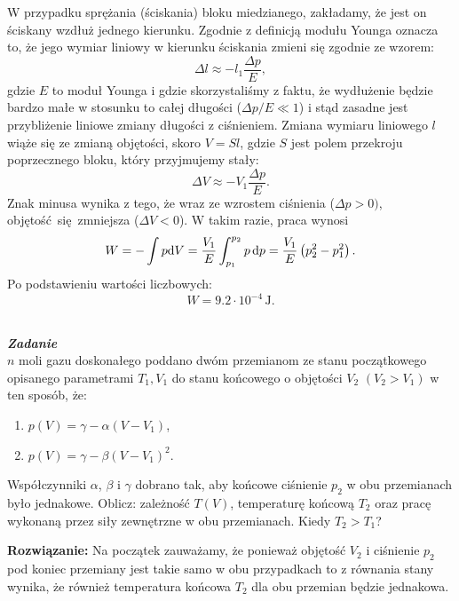 \documentclass[11pt,a4paper]{article}
\newcounter{zadanie}\newcommand{\zadanie}[1][]{\addtocounter{zadanie}{1} ~\\  {\bf \emph{Zadanie \arabic{zadanie} #1 }} \\}
\renewcommand{\t}[1]{\textrm{#1}}
\begin{document}
W przypadku sprężania (ściskania) bloku miedzianego, zakładamy, że jest on ściskany wzdłuż jednego kierunku. Zgodnie z definicją modułu Younga oznacza to,  że jego wymiar liniowy w kierunku ściskania zmieni się zgodnie ze wzorem:
$$
\Delta l \approx -l_1 \frac{\Delta p}{E},
$$
gdzie $E$ to moduł Younga i gdzie skorzystaliśmy z faktu, że wydłużenie będzie bardzo małe w stosunku
to całej długości ($\Delta p /E \ll 1$) i stąd zasadne jest przybliżenie liniowe zmiany długości z ciśnieniem.
Zmiana wymiaru liniowego $l$ wiąże się ze zmianą objętości, skoro $V = S l$,
 gdzie $S$ jest polem przekroju poprzecznego bloku, który przyjmujemy stały:
$$
\Delta V \approx   - V_1 \frac{\Delta p}{E}.
$$
Znak minusa wynika z tego, że wraz ze wzrostem ciśnienia ($\Delta p > 0)$, objętość się zmniejsza ($\Delta V < 0$). 
W takim razie, praca wynosi
$$
W = - \int p {\rm d}V = \frac{V_1}{E} \int_{p_1}^{p_2} p\, {\rm d} p = \frac{V_1}{E} \left(p_2^2 - p_1^2 \right).
$$
Po podstawieniu wartości liczbowych:
$$
W = 9.2 \cdot 10^{-4}\,\t{J}.
$$

\zadanie
$n$ moli gazu doskonałego poddano dwóm przemianom ze stanu początkowego
opisanego parametrami $T_1, V_1$ do stanu końcowego o objętości $V_2$
$(V_2>V_1)$ w ten
sposób, że:\begin{enumerate}
\item $p(V) = \gamma - \alpha (V-V_1)$,
\item $p(V) = \gamma - \beta (V-V_1)^2$.
\end{enumerate}
Współczynniki $\alpha$, $\beta$ i $\gamma$ dobrano tak,
aby końcowe ciśnienie $p_2$ w obu przemianach było jednakowe.
Oblicz: zależność $T(V)$, temperaturę końcową $T_2$
oraz pracę wykonaną przez siły zewnętrzne w obu przemianach.
Kiedy $T_2>T_1$?

\vskip 10pt
\textbf{Rozwiązanie:}
Na początek zauważamy, że ponieważ objętość $V_2$ i ciśnienie $p_2$ pod koniec przemiany jest takie samo w obu przypadkach to z równania stany wynika, że również temperatura
końcowa $T_2$ dla obu przemian będzie jednakowa.
\end{document}
